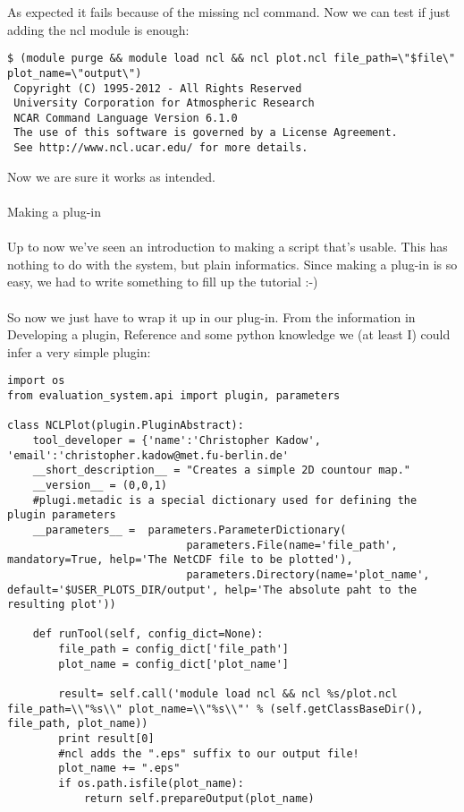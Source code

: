 \documentclass[a4paper,11pt]{ltxdoc}
\begin{document}
As expected it fails because of the missing ncl command. Now we can test if just adding the ncl module is enough:
\begin{verbatim}
$ (module purge && module load ncl && ncl plot.ncl file_path=\"$file\" plot_name=\"output\")
 Copyright (C) 1995-2012 - All Rights Reserved
 University Corporation for Atmospheric Research
 NCAR Command Language Version 6.1.0
 The use of this software is governed by a License Agreement.
 See http://www.ncl.ucar.edu/ for more details.
\end{verbatim}
Now we are sure it works as intended.\\
\\
Making a plug-in\\
\\
Up to now we've seen an introduction to making a script that's usable. This has nothing to do with the system, but plain informatics.
Since making a plug-in is so easy, we had to write something to fill up the tutorial :-)\\
\\
So now we just have to wrap it up in our plug-in. From the information in Developing a plugin, Reference and some python knowledge we (at least I) could infer a very simple plugin:
\begin{verbatim}
import os
from evaluation_system.api import plugin, parameters

class NCLPlot(plugin.PluginAbstract):
    tool_developer = {'name':'Christopher Kadow', 'email':'christopher.kadow@met.fu-berlin.de'
    __short_description__ = "Creates a simple 2D countour map." 
    __version__ = (0,0,1)
    #plugi.metadic is a special dictionary used for defining the plugin parameters
    __parameters__ =  parameters.ParameterDictionary(
                            parameters.File(name='file_path', mandatory=True, help='The NetCDF file to be plotted'),
                            parameters.Directory(name='plot_name', default='$USER_PLOTS_DIR/output', help='The absolute paht to the resulting plot'))

    def runTool(self, config_dict=None):
        file_path = config_dict['file_path']
        plot_name = config_dict['plot_name']

        result= self.call('module load ncl && ncl %s/plot.ncl file_path=\\"%s\\" plot_name=\\"%s\\"' % (self.getClassBaseDir(), file_path, plot_name))
        print result[0]
        #ncl adds the ".eps" suffix to our output file!
        plot_name += ".eps" 
        if os.path.isfile(plot_name):
            return self.prepareOutput(plot_name)
\end{verbatim}
\end{document}
